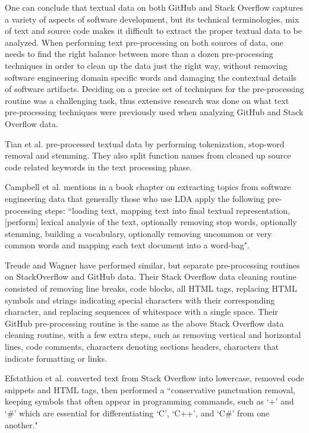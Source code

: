     One can conclude that textual data on both GitHub and Stack Overflow captures a variety of aspects of software development, but its technical terminologies, mix of text and source code makes it difficult to extract the proper textual data to be analyzed. When performing text pre-processing on both sources of data, one needs to find the right balance between more than a dozen pre-processing techniques in order to clean up the data just the right way, without removing software engineering domain specific words and damaging the contextual details of software artifacts. Deciding on a precise set of techniques for the pre-processing routine was a challenging task, thus extensive research was done on what text pre-processing techniques were previously used when analyzing GitHub and Stack Overflow data.
    
    Tian et al. \cite{tian2013predicting} pre-processed textual data by performing tokenization, stop-word removal and stemming. They also split function names from cleaned up source code related keywords in the text processing phase.
    
    Campbell et al. \cite{campbell2015latent} mentions in a book chapter on extracting topics from software engineering data that generally those who use LDA apply the following pre-processing steps: ``loading text, mapping text into final textual representation, [perform] lexical analysis of the text, optionally removing stop words, optionally stemming, building a vocabulary, optionally removing uncommon or very common words and mapping each text document into a word-bag". 
    
    Treude and Wagner \cite{treude2019predicting} have performed similar, but separate pre-processing routines on StackOverflow and GitHub data. Their Stack Overflow data cleaning routine consisted of removing line breaks, code blocks, all HTML tags, replacing HTML symbols and strings indicating special characters with their corresponding character, and replacing sequences of whitespace with a single space. Their GitHub pre-processing routine is the same as the above Stack Overflow data cleaning routine, with a few extra steps, such as removing vertical and horizontal lines, code comments, characters denoting sections headers, characters that indicate formatting or links. 
    
    Efstathiou et al. \cite{efstathiou2018word} converted text from Stack Overflow into lowercase, removed code snippets and HTML tags, then performed a ``conservative punctuation removal, keeping symbols that often appear in programming commands, such as ‘+’ and ‘\#’ which are essential for differentiating ‘C’, ‘C++’, and ‘C\#’ from one another."
    
